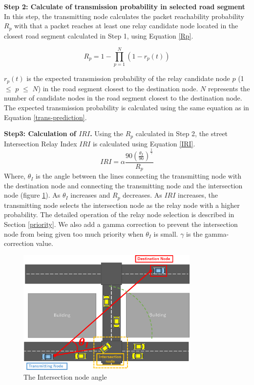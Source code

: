 \documentclass[conference]{IEEEtran}
\begin{document}
\textbf{Step 2: Calculate of transmission probability in selected road segment}
In this step, the transmitting node calculates the packet reachability probability $R_p$ with that a packet reaches at least one relay candidate node located in the closest road segment calculated in Step 1, using Equation \ref{Rp}.

\begin{equation}
\label{Rp}
R_p = 1 - \prod_{p=1}^N (1 - r_{p}(t))
\end{equation}

$r_p(t)$ is the expected transmission probability of the relay candidate node $p$ (1 $\leq$  $p$ $\leq$ $N$) in the road segment closest to the destination node. 
$N$ represents the number of candidate nodes in the road segment closest to the destination node. 
The expected transmission probability is calculated using the same equation as in Equation \ref{trans-prediction}.


\textbf{Step3: Calculation of $IRI$.}
Using the $R_p$ calculated in Step 2, the street Intersection Relay  Index $IRI$ is calculated using Equation \ref{IRI}.
\begin{equation}
\label{IRI}
IRI = \alpha\frac{90\left(\frac{\theta_I}{90}\right)^\frac{1}{{\gamma}}}{R_p}
\end{equation}
Where, $\theta_I$ is the angle between the lines connecting the transmitting node with the destination node and  connecting the transmitting node and the intersection node (figure \ref{fig:intersection_angle}).
As $\theta_I$  increases and $R_p$ decreases. 
As $IRI$ increases, the transmitting node selects the intersection node as the relay node with a higher probability. The detailed operation of the relay node selection is described in Section \ref{priority}.
We also add a gamma correction to prevent the intersection node from being given too much priority when $\theta_I$ is small.
$\gamma$ is the gamma-correction value.


\begin{figure}[!ht]
\centering
\includegraphics[width=90mm]{figures/Intersection_angle.eps}
\caption{The Intersection node angle}
\label{fig:intersection_angle}
\end{figure}
\end{document}
